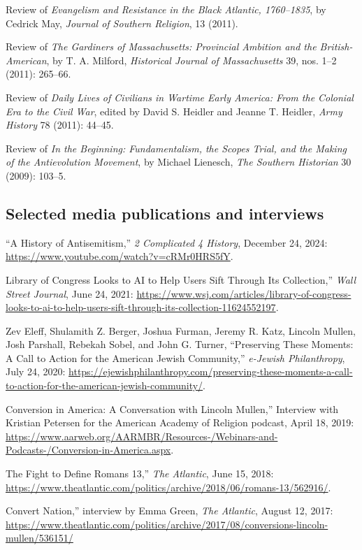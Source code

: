\documentclass[11pt]{article}
\begin{document}
Review of \emph{Evangelism and Resistance in the Black Atlantic, 1760--1835}, by Cedrick May, \emph{Journal of Southern Religion}, 13 (2011).

Review of \emph{The Gardiners of Massachusetts: Provincial Ambition and the British-American}, by T. A. Milford, \emph{Historical Journal of Massachusetts} 39, nos. 1--2 (2011): 265--66.

Review of \emph{Daily Lives of Civilians in Wartime Early America: From the Colonial Era to the Civil War}, edited by David S. Heidler and Jeanne T. Heidler, \emph{Army History} 78 (2011): 44--45.

Review of \emph{In the Beginning: Fundamentalism, the Scopes Trial, and the Making of the Antievolution Movement}, by Michael Lienesch, \emph{The Southern Historian} 30 (2009): 103--5.

\subsection{Selected media publications and interviews}\label{Selected media}

``A History of Antisemitism,'' \emph{2 Complicated 4 History}, December 24, 2024: \url{https://www.youtube.com/watch?v=cRMr0HRS5fY}.

\noindent{}Library of Congress Looks to AI to Help Users Sift Through Its Collection,'' \emph{Wall Street Journal}, June 24, 2021: \url{https://www.wsj.com/articles/library-of-congress-looks-to-ai-to-help-users-sift-through-its-collection-11624552197}.

Zev Eleff, Shulamith Z. Berger, Joshua Furman, Jeremy R. Katz, Lincoln Mullen, 
Josh Parshall, Rebekah Sobel, and John G. Turner, ``Preserving These Moments: A Call to Action for the American Jewish Community,'' \emph{e-Jewish Philanthropy}, July 24, 2020: \url{https://ejewishphilanthropy.com/preserving-these-moments-a-call-to-action-for-the-american-jewish-community/}.

\noindent{}Conversion in America: A Conversation with Lincoln Mullen,'' Interview with Kristian Petersen for the American Academy of Religion podcast, April 18, 2019: \url{https://www.aarweb.org/AARMBR/Resources-/Webinars-and-Podcasts-/Conversion-in-America.aspx}.

\noindent{}The Fight to Define Romans 13,'' \emph{The Atlantic}, June 15, 2018: \url{https://www.theatlantic.com/politics/archive/2018/06/romans-13/562916/}.

\noindent{}Convert Nation,'' interview by Emma Green, \emph{The Atlantic}, August 12, 2017: \url{https://www.theatlantic.com/politics/archive/2017/08/conversions-lincoln-mullen/536151/}
\end{document}
